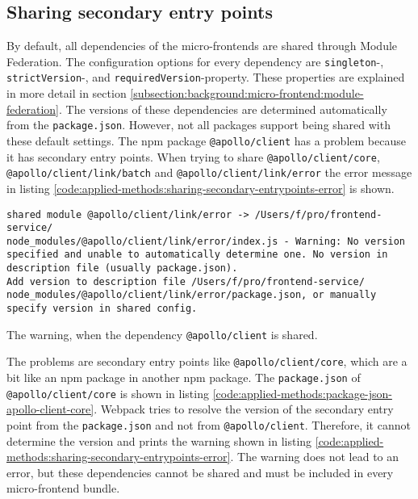 \subsection{Sharing secondary entry points}\label{subsection:applied-methods:prototypical-implementation:sharing
-secondary-entrypoints}

By default, all dependencies of the micro-frontends are shared through Module Federation. The configuration options for every dependency are \texttt{singleton}-, \texttt{strictVersion}-, and \texttt{requiredVersion}-property. These properties are explained in more detail in section \ref{subsection:background:micro-frontend:module-federation}. The versions of these dependencies are determined automatically from the \texttt{package.json}. However, not all packages support being shared with these default settings. The npm package \texttt{@apollo/client} has a problem because it has secondary entry points. When trying to share \texttt{@apollo/client/core}, \texttt{@apollo/client/link/batch} and \texttt{@apollo/client/link/error} the error message in listing \ref{code:applied-methods:sharing-secondary-entrypoints-error} is shown.

\ifshowListings
\begin{listing}[H]
    \begin{verbatim}
shared module @apollo/client/link/error -> /Users/f/pro/frontend-service/
node_modules/@apollo/client/link/error/index.js - Warning: No version 
specified and unable to automatically determine one. No version in 
description file (usually package.json).
Add version to description file /Users/f/pro/frontend-service/
node_modules/@apollo/client/link/error/package.json, or manually 
specify version in shared config.
    \end{verbatim}
    \caption{The warning, when the dependency \texttt{@apollo/client} is shared.}\label{code:applied-methods:sharing-secondary-entrypoints-error}
\end{listing}
\fi


\noindent The problems are secondary entry points like \texttt{@apollo/client/core}, which are a bit like an npm package in another npm package. The \texttt{package.json} of \texttt{@apollo/client/core} is shown in listing \ref{code:applied-methods:package-json-apollo-client-core}. Webpack tries to resolve the version of the secondary entry point from the \texttt{package.json} and not from \texttt{@apollo/client}. Therefore, it cannot determine the version and prints the warning shown in listing \ref{code:applied-methods:sharing-secondary-entrypoints-error}. The warning does not lead to an error, but these dependencies cannot be shared and must be included in every micro-frontend bundle.

